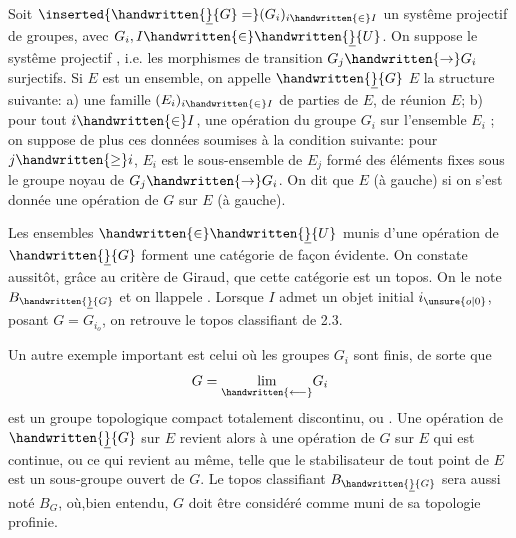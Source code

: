  Soit $\inserted{\handwritten{\underline}{G}=}(G_i)_{i\handwritten{\in}I}$ un systême projectif  de groupes, avec $G_i,I\handwritten{\in}\handwritten{\underline}{U}$. On suppose le systême projectif , i.e. les morphismes de transition $G_j\handwritten{\to}G_i$ surjectifs. Si $E$ est un ensemble, on   appelle  $\handwritten{\underline}{G}$  $E$ la structure suivante: a) une famille $(E_i)_{i\handwritten{\in}I}$ de parties de $E$, de réunion $E$; b) pour tout $i\handwritten{\in}I$, une opération du groupe $G_i$ sur l'ensemble $E_i$ ; on suppose de plus ces données soumises à la condition suivante: pour $j\handwritten{\geq}i$, $E_i$ est le sous-ensemble de $E_j$ formé des éléments fixes sous le groupe noyau de $G_j\handwritten{\to}G_i$. On dit  que  $E$ (à gauche) si on s'est donnée une opération de $G$ sur $E$ (à gauche).

Les ensembles $\handwritten{\in}\handwritten{\underline}{U}$ munis d'une opération de $\handwritten{\underline}{G}$ forment une catégorie de façon évidente. On constate aussitôt, grâce au critère de Giraud, que cette catégorie est un topos. On le note $B_{\handwritten{\underline}{G}}$ et on llappele . Lorsque $I$ admet un objet  initial $i_{\unsure{o|0}}$, posant $G=G_{i_o}$, on retrouve le topos classifiant de 2.3.

 Un autre exemple important est celui où les groupes $G_i$ sont finis, de sorte que
\[
G=\underset{\handwritten{\longleftarrow}}{\lim}G_i
\]
est un groupe topologique compact totalement discontinu, ou . Une opération de $\handwritten{\underline}{G}$ sur $E$ revient alors à une opération de $G$ sur $E$ qui est continue, ou ce qui revient au même, telle que le stabilisateur de tout point de $E$ est un sous-groupe ouvert de $G$. Le topos classifiant $B_{\handwritten{\underline}{G}}$ sera aussi noté $B_G$, où,bien entendu, $G$ doit être considéré comme muni de sa topologie profinie.


